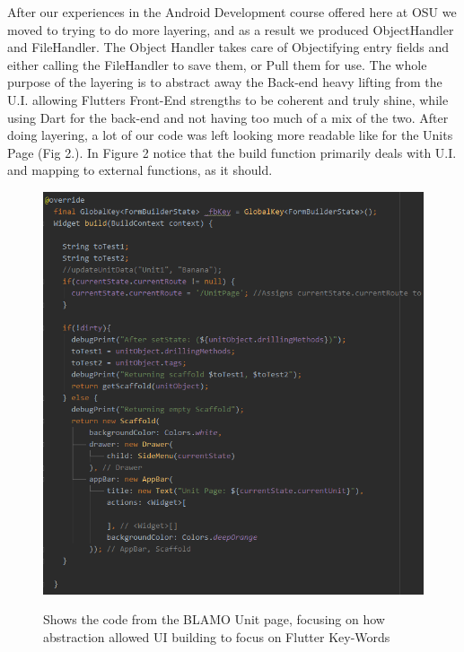 \documentclass[onecolumn, draftclsnofoot,10pt, compsoc]{IEEEtran}
\begin{document}
\par
After our experiences in the Android Development course offered here at OSU we moved to trying to do more layering, and as a result we produced ObjectHandler and FileHandler. The Object Handler takes care of Objectifying entry fields and either calling the FileHandler to save them, or Pull them for use. The whole purpose of the layering is to abstract away the Back-end heavy lifting from the U.I. allowing Flutters Front-End strengths to be coherent and truly shine, while using Dart for the back-end and not having too much of a mix of the two. After doing layering, a lot of our code was left looking more readable like for the Units Page (Fig 2.). In Figure 2 notice that the build function primarily deals with U.I. and mapping to external functions, as it should.
\begin{figure}[!htb]
    \centering
    \includegraphics[scale=0.5]{Images/Capture2.PNG}
    \label{Fig 2.}
    \caption{ Shows the code from the BLAMO Unit page, focusing on how abstraction allowed UI building to focus on Flutter Key-Words}
\end{figure}
\par
\end{document}
